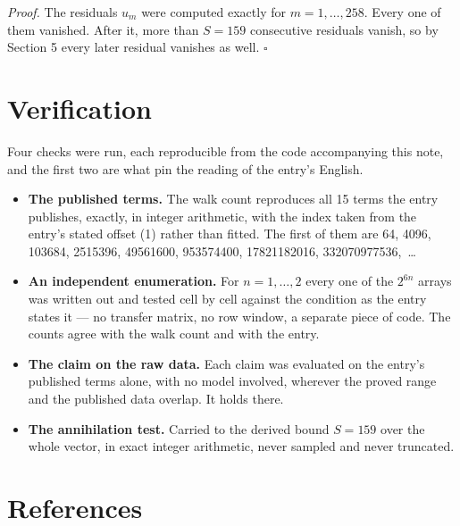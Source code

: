 \documentclass[11pt]{article}
\theoremstyle{definition}
\begin{document}
{\itshape Proof.} The residuals $u_m$ were computed exactly for $m = 1,\dots,258$. Every one of them vanished. After it, more than $S = 159$ consecutive residuals vanish, so by Section 5 every later residual vanishes as well. $\square$

\section{Verification}

Four checks were run, each reproducible from the code accompanying this note, and the first two are what pin the reading of the entry's English.

\begin{itemize}

\item {\bfseries The published terms.} The walk count reproduces all 15 terms the entry publishes, exactly, in integer arithmetic, with the index taken from the entry's stated offset (1) rather than fitted. The first of them are 64, 4096, 103684, 2515396, 49561600, 953574400, 17821182016, 332070977536,~\dots

\item {\bfseries An independent enumeration.} For $n = 1,\dots,2$ every one of the $2^{6n}$ arrays was written out and tested cell by cell against the condition as the entry states it --- no transfer matrix, no row window, a separate piece of code. The counts agree with the walk count and with the entry.

\item {\bfseries The claim on the raw data.} Each claim was evaluated on the entry's published terms alone, with no model involved, wherever the proved range and the published data overlap. It holds there.

\item {\bfseries The annihilation test.} Carried to the derived bound $S = 159$ over the whole vector, in exact integer arithmetic, never sampled and never truncated.

\end{itemize}

\section{References}
\end{document}
